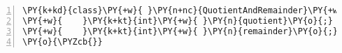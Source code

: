 \begin{Verbatim}[commandchars=\\\{\},numbers=left,firstnumber=1,stepnumber=1,frame=single,fontsize=\small]
\PY{k+kd}{class}\PY{+w}{ }\PY{n+nc}{QuotientAndRemainder}\PY{+w}{ }\PY{k+kd}{implements}\PY{+w}{ }\PY{n}{Output}\PY{+w}{ }\PY{o}{\PYZob{}}
\PY{+w}{    }\PY{k+kt}{int}\PY{+w}{ }\PY{n}{quotient}\PY{o}{;}
\PY{+w}{    }\PY{k+kt}{int}\PY{+w}{ }\PY{n}{remainder}\PY{o}{;}
\PY{o}{\PYZcb{}}
\end{Verbatim}
